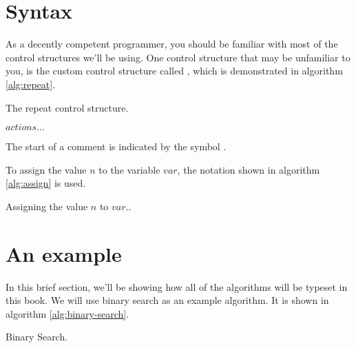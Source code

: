 \section{Syntax}
\label{sec:other-conventions}

As a decently competent programmer, you should be familiar with most
of the control structures we'll be using. One control structure that
may be unfamiliar to you, is the custom control structure called
\algorithmicrepeat, which is demonstrated in algorithm
\ref{alg:repeat}.


\begin{algorithm}[H]
  \caption{The repeat control structure.}
  \label{alg:repeat}
  \begin{algorithmic}[1]
      \State $actions\ldots$ 
    \EndRepeatn
  \end{algorithmic}
\end{algorithm}

The start of a comment is indicated by the symbol \commentsymbol.

To assign the value $n$ to the variable $var$, the notation shown in
algorithm \ref{alg:assign} is used.

\begin{algorithm}[H]
  \caption{Assigning the value $n$ to $var$..}
  \label{alg:assign}
  \begin{algorithmic}[1]
  \end{algorithmic}
\end{algorithm}

\section{An example}

In this brief section, we'll be showing how all of the algorithms will
be typeset in this book. We will use binary search as an example
algorithm. It is shown in algorithm \ref{alg:binary-search}.

\begin{algorithm}[H]
  \caption{Binary Search.}
  \label{alg:binary-search}
  \begin{algorithmic}[1]
      \Repeat
        \Else
        \EndIf
    \EndFunction
  \end{algorithmic}
\end{algorithm}